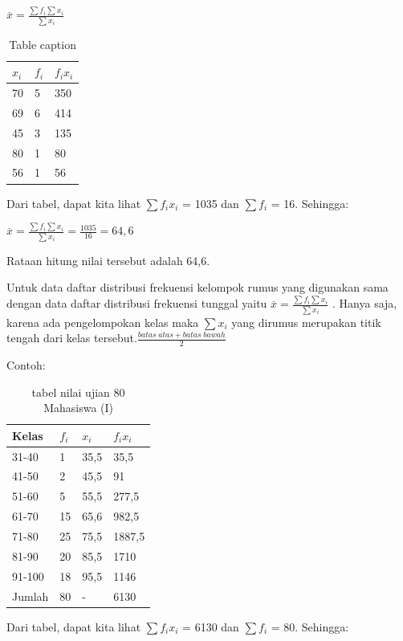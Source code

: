 \documentclass[11pt,fleqn]{book} %
\begin{document}
{$\overline{x} = \frac{\sum f_{i}\sum x_{i}}{\sum x_{i}}$


\begin{table}[h]
\centering
\begin{tabular}{l l l}
\toprule
\textbf{$x_{i}$} & \textbf{$f_{i}$} & \textbf{$f_{i}x_{i}$}\\
\midrule
70 & 5 & 350 \\
69 & 6 & 414\\
45 & 3 & 135\\
80 & 1 & 80\\
56 & 1 & 56\\
\bottomrule
\end{tabular}
\caption{Table caption}
\end{table}

Dari tabel, dapat kita lihat $\sum f_{i}x_{i}$  = 1035 dan $\sum f_{i}$  = 16. Sehingga:

$ \overline{x} = \frac{\sum f_{i}\sum x_{i}}{\sum x_{i}} = \frac{1035}{16} = 64,6 $

Rataan hitung nilai tersebut adalah 64,6.


Untuk data daftar distribusi frekuensi kelompok rumus yang digunakan sama dengan data daftar distribusi frekuensi tunggal yaitu $\overline{x} = \frac{\sum f_{i}\sum x_{i}}{\sum x_{i}}$ . Hanya saja, karena ada pengelompokan kelas maka $\sum x_{i}$ yang dirumus merupakan titik tengah dari kelas tersebut.$\frac{batas\;atas + batas\;bawah}{2}$

Contoh: 

\begin{table}[h]
\centering
\begin{tabular}{l l l l}
\toprule
\textbf{Kelas} & \textbf{$f_{i}$} & \textbf{$x_{i}$} & \textbf{$f_{i}x_{i}$}\\
\midrule
31-40 & 1 & 35,5 & 35,5 \\
41-50 & 2 & 45,5 & 91 \\
51-60 & 5 & 55,5 & 277,5\\
61-70 & 15 & 65,6 & 982,5\\
71-80 & 25 & 75,5 & 1887,5\\
81-90 & 20 & 85,5 & 1710\\
91-100 & 18 & 95,5 & 1146\\
Jumlah & 80 & - & 6130 \\
\bottomrule
\end{tabular}
\caption{tabel nilai ujian 80 Mahasiswa (I)}
\end{table}

Dari tabel, dapat kita lihat $\sum f_{i}x_{i}$  = 6130 dan $\sum f_{i}$  = 80. Sehingga:


}
\end{document}
